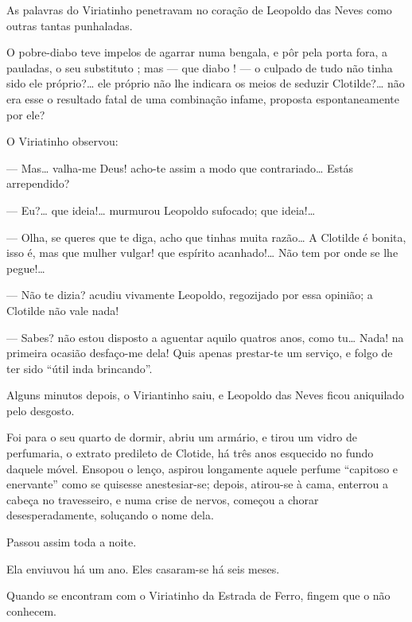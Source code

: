 As palavras do Viriatinho penetravam no coração de Leopoldo das Neves
como outras tantas punhaladas.

O pobre-diabo teve impelos de agarrar numa bengala, e pôr pela porta
fora, a pauladas, o seu substituto ; mas --- que diabo ! --- o culpado
de tudo não tinha sido ele próprio?\ldots{} ele próprio não lhe indicara os
meios de seduzir Clotilde?\ldots{} não era esse o resultado fatal de uma
combinação infame, proposta espontaneamente por ele?

O Viriatinho observou:

--- Mas\ldots{} valha-me Deus! acho-te assim a modo que contrariado\ldots{} Estás
arrependido?

--- Eu?\ldots{} que ideia!\ldots{} murmurou Leopoldo sufocado; que ideia!\ldots{}

--- Olha, se queres que te diga, acho que tinhas muita razão\ldots{} A
Clotilde é bonita, isso é, mas que mulher vulgar! que espírito
acanhado!\ldots{} Não tem por onde se lhe pegue!\ldots{}

--- Não te dizia? acudiu vivamente Leopoldo, regozijado por essa
opinião; a Clotilde não vale nada!

--- Sabes? não estou disposto a aguentar aquilo quatros anos, como tu\ldots{}
Nada! na primeira ocasião desfaço-me dela! Quis apenas prestar-te um
serviço, e folgo de ter sido ``útil inda brincando''.

Alguns minutos depois, o Viriantinho saiu, e Leopoldo das Neves ficou
aniquilado pelo desgosto.

Foi para o seu quarto de dormir, abriu um armário, e tirou um vidro de
perfumaria, o extrato predileto de Clotide, há três anos esquecido no
fundo daquele móvel. Ensopou o lenço, aspirou longamente aquele perfume
``capitoso e enervante'' como se quisesse anestesiar-se; depois,
atirou-se à cama, enterrou a cabeça no travesseiro, e numa crise de
nervos, começou a chorar desesperadamente, soluçando o nome dela.

Passou assim toda a noite.

Ela enviuvou há um ano. Eles casaram-se há seis meses.

Quando se encontram com o Viriatinho da Estrada de Ferro, fingem que o
não conhecem.

